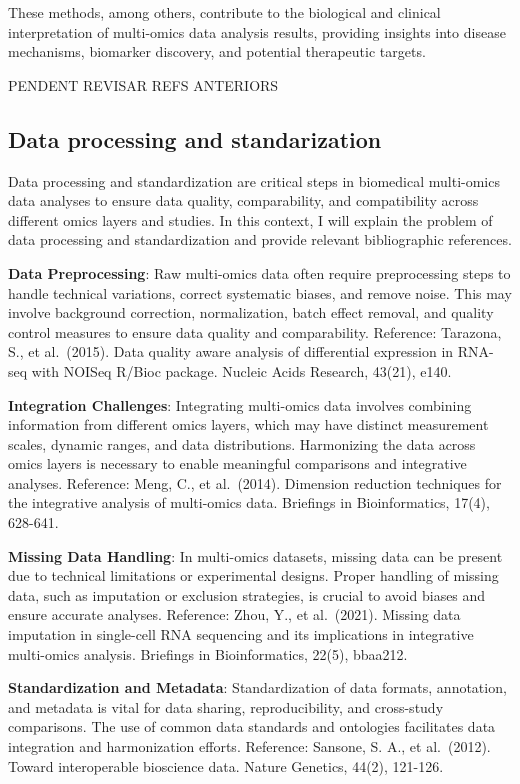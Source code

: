 \documentclass[a4paper, nobind]{templates/ociamthesis}
\begin{document}
These methods, among others, contribute to the biological and clinical interpretation of multi-omics data analysis results, providing insights into disease mechanisms, biomarker discovery, and potential therapeutic targets.

PENDENT REVISAR REFS ANTERIORS

\hypertarget{data-processing-and-standarization}{%
\subsection{Data processing and standarization}\label{data-processing-and-standarization}}

Data processing and standardization are critical steps in biomedical multi-omics data analyses to ensure data quality, comparability, and compatibility across different omics layers and studies. In this context, I will explain the problem of data processing and standardization and provide relevant bibliographic references.

\textbf{Data Preprocessing}: Raw multi-omics data often require preprocessing steps to handle technical variations, correct systematic biases, and remove noise. This may involve background correction, normalization, batch effect removal, and quality control measures to ensure data quality and comparability. Reference: Tarazona, S., et al.~(2015). Data quality aware analysis of differential expression in RNA-seq with NOISeq R/Bioc package. Nucleic Acids Research, 43(21), e140.

\textbf{Integration Challenges}: Integrating multi-omics data involves combining information from different omics layers, which may have distinct measurement scales, dynamic ranges, and data distributions. Harmonizing the data across omics layers is necessary to enable meaningful comparisons and integrative analyses. Reference: Meng, C., et al.~(2014). Dimension reduction techniques for the integrative analysis of multi-omics data. Briefings in Bioinformatics, 17(4), 628-641.

\textbf{Missing Data Handling}: In multi-omics datasets, missing data can be present due to technical limitations or experimental designs. Proper handling of missing data, such as imputation or exclusion strategies, is crucial to avoid biases and ensure accurate analyses. Reference: Zhou, Y., et al.~(2021). Missing data imputation in single-cell RNA sequencing and its implications in integrative multi-omics analysis. Briefings in Bioinformatics, 22(5), bbaa212.

\textbf{Standardization and Metadata}: Standardization of data formats, annotation, and metadata is vital for data sharing, reproducibility, and cross-study comparisons. The use of common data standards and ontologies facilitates data integration and harmonization efforts. Reference: Sansone, S. A., et al.~(2012). Toward interoperable bioscience data. Nature Genetics, 44(2), 121-126.
\end{document}
